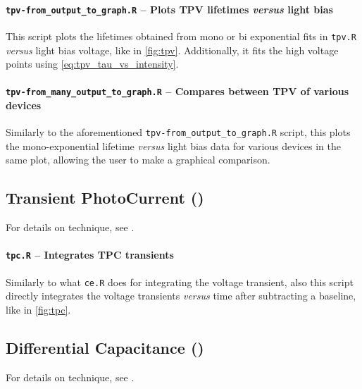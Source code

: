 		\paragraph{\texttt{tpv-\-from\_output\_to\_graph.R} -- Plots TPV lifetimes \textsl{versus} light bias}
		This script plots the lifetimes obtained from mono or bi exponential fits in \texttt{tpv.R} \textsl{versus} light bias voltage, like in \cref{fig:tpv}.
		Additionally, it fits the high voltage points using \cref{eq:tpv_tau_vs_intensity}.
		
		\paragraph{\texttt{tpv-\-from\_many\_output\_to\_graph.R} -- Compares between TPV of various devices}
		Similarly to the aforementioned \texttt{tpv-\-from\_output\_to\_graph.R} script, this plots the mono\hyp{}exponential lifetime \textsl{versus} light bias data for various devices in the same plot, allowing the user to make a graphical comparison.
	\subsection{Transient PhotoCurrent ()}\label{r_tpc}
		For details on  technique, see .

		\paragraph{\texttt{tpc.R} -- Integrates TPC transients}
		Similarly to what \texttt{ce.R} does for integrating the  voltage transient, also this script directly integrates the voltage transients \textsl{versus} time after subtracting a baseline, like in \cref{fig:tpc}.

	\subsection{Differential Capacitance ()}\label{r_dc}
		For details on  technique, see .

